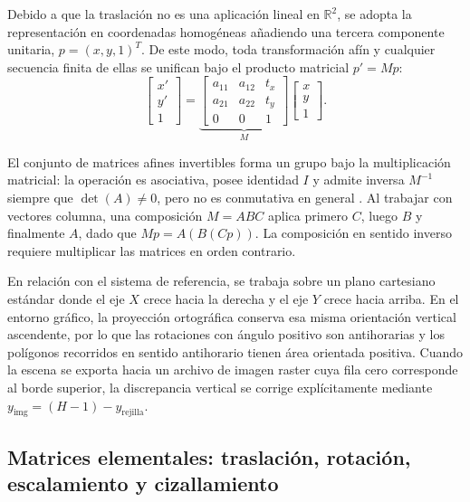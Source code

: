 \documentclass[a4paper,10pt]{article}
\begin{document}
Debido a que la traslación no es una aplicación lineal en $\mathbb{R}^2$, se adopta la representación en coordenadas homogéneas añadiendo una tercera componente unitaria, $p = (x, y, 1)^T$. De este modo, toda transformación afín y cualquier secuencia finita de ellas se unifican bajo el producto matricial $p' = M p$:
\begin{equation}
  \begin{bmatrix} x' \\ y' \\ 1 \end{bmatrix}
  =
  \underbrace{\begin{bmatrix}
    a_{11} & a_{12} & t_x \\
    a_{21} & a_{22} & t_y \\
    0 & 0 & 1
  \end{bmatrix}}_{M}
  \begin{bmatrix} x \\ y \\ 1 \end{bmatrix}.
\end{equation}

El conjunto de matrices afines invertibles forma un grupo bajo la multiplicación matricial: la operación es asociativa, posee identidad $I$ y admite inversa $M^{-1}$ siempre que $\det(A) \neq 0$, pero no es conmutativa en general \citep{vince2012}. Al trabajar con vectores columna, una composición $M = A B C$ aplica primero $C$, luego $B$ y finalmente $A$, dado que $M p = A(B(Cp))$. La composición en sentido inverso requiere multiplicar las matrices en orden contrario.

En relación con el sistema de referencia, se trabaja sobre un plano cartesiano estándar donde el eje $X$ crece hacia la derecha y el eje $Y$ crece hacia arriba. En el entorno gráfico, la proyección ortográfica conserva esa misma orientación vertical ascendente, por lo que las rotaciones con ángulo positivo son antihorarias y los polígonos recorridos en sentido antihorario tienen área orientada positiva. Cuando la escena se exporta hacia un archivo de imagen raster cuya fila cero corresponde al borde superior, la discrepancia vertical se corrige explícitamente mediante $y_{\text{img}} = (H - 1) - y_{\text{rejilla}}$.

\subsection{Matrices elementales: traslación, rotación, escalamiento y cizallamiento}
\end{document}
